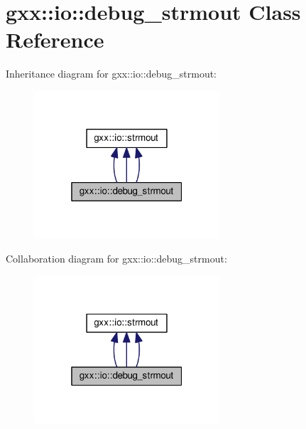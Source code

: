 \hypertarget{classgxx_1_1io_1_1debug__strmout}{}\section{gxx\+:\+:io\+:\+:debug\+\_\+strmout Class Reference}
\label{classgxx_1_1io_1_1debug__strmout}


Inheritance diagram for gxx\+:\+:io\+:\+:debug\+\_\+strmout\+:
\nopagebreak
\begin{figure}[H]
\begin{center}
\leavevmode
\includegraphics[width=196pt]{classgxx_1_1io_1_1debug__strmout__inherit__graph}
\end{center}
\end{figure}


Collaboration diagram for gxx\+:\+:io\+:\+:debug\+\_\+strmout\+:
\nopagebreak
\begin{figure}[H]
\begin{center}
\leavevmode
\includegraphics[width=196pt]{classgxx_1_1io_1_1debug__strmout__coll__graph}
\end{center}
\end{figure}
